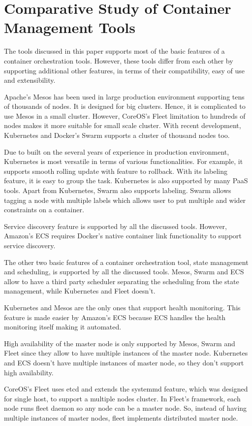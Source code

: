 \section{Comparative Study of Container Management Tools}
\label{sec:comparison}
The tools  discussed in this paper supports most of the basic features of a container orchestration tools. However, these tools differ from each other by supporting additional other features, in terms of their compatibility, easy of use and extensibility. 

Apache's Mesos has  been used in large production environment supporting tens of thousands of nodes. It is designed for big clusters. Hence, it is complicated to use Mesos in a small cluster. However, CoreOS's Fleet limitation to hundreds of nodes makes it more suitable for small scale cluster. With recent development, Kubernetes and Docker's Swarm supports a cluster of thousand nodes too. 

Due to built on the several years of experience in production environment, Kubernetes is most versatile in terms of various functionalities. For example, it supports smooth rolling update with feature to rollback. With its labeling feature, it is easy to group the task. Kubernetes is also supported by many PaaS tools. Apart from Kubernetes, Swarm also supports labeling. Swarm allows tagging a node with multiple labels which allows user to put multiple and wider constraints on a container.

Service discovery feature is supported by all the discussed tools. However, Amazon's ECS requires Docker's native container link functionality to support service discovery. 

The other two basic features of a container orchestration tool, state management and scheduling, is supported by all the discussed tools.  Mesos, Swarm and ECS allow to have a third party scheduler separating the scheduling from the state management, while Kubernetes and Fleet doesn't.

Kubernetes and Mesos are the only ones that support health monitoring. This feature is made easier by Amazon's ECS because ECS handles the health monitoring itself making it automated.

High availability of the master node is only supported by Mesos, Swarm and Fleet since they allow to have multiple instances of the master node. Kubernetes and ECS doesn't have multiple instances of master node, so they don't support high availability.

CoreOS's Fleet uses etcd and extends the systemmd feature, which was designed for single host, to support a multiple nodes cluster. In Fleet's framework, each node runs fleet daemon so any node can be a master node. So, instead of having multiple instances of master nodes, fleet implements distributed master node. 

